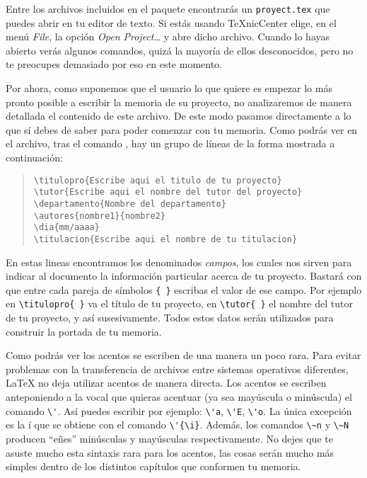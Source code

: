 Entre los archivos incluidos en el paquete encontrar\'as un \texttt{proyect.tex} que puedes abrir en tu editor de texto. 
Si est\'as usando \TeX{}nicCenter elige, en el men\'u \emph{File}, la opci\'on \emph{Open Project\dots}
y abre dicho archivo. Cuando lo hayas abierto ver\'as algunos comandos, quiz\'a la mayor\'ia de ellos desconocidos, 
pero no te preocupes demasiado por eso en este momento.

Por ahora, como suponemos que el usuario lo que quiere es empezar lo m\'as pronto posible a escribir la memoria de su 
proyecto, no analizaremos de manera detallada el contenido de este archivo. De este modo pasamos directamente a lo que 
s\'i debes de saber para poder comenzar con tu memoria. Como podr\'as ver en el archivo, tras el comando 
\verb++, hay un grupo de l\'ineas de la forma mostrada a continuaci\'on:

\begin{quote}
\begin{verbatim}
\titulopro{Escribe aqui el titulo de tu proyecto}
\tutor{Escribe aqui el nombre del tutor del proyecto}
\departamento{Nombre del departamento}
\autores{nombre1}{nombre2}
\dia{mm/aaaa}
\titulacion{Escribe aqui el nombre de tu titulacion}
\end{verbatim}
\end{quote}

En estas lineas encontramos los denominados \emph{campos}, los cuales nos sirven para indicar al documento
la informaci\'on particular acerca de tu proyecto. Bastar\'a con que entre cada pareja de s\'imbolos 
\verb|{ }| escribas el valor de ese campo. Por ejemplo en \verb|\titulopro{ }| va el t\'itulo de tu proyecto, 
en \verb|\tutor{ }| el nombre del tutor de tu proyecto, y as\'i susesivamente. Todos estos datos ser\'an utilizados
para construir la portada de tu memoria.

Como podr\'as ver los acentos se escriben de una manera un poco rara. Para evitar problemas
con la transferencia de archivos entre sistemas operativos diferentes, \LaTeX{} no
deja utilizar acentos de manera directa. Los acentos se escriben anteponiendo
a la vocal que quieras acentuar (ya sea may\'uscula o min\'uscula) el comando \verb|\'|.
As\'i puedes escribir por ejemplo: \verb|\'a|, \verb|\'E|, \verb|\'o|. La \'unica
excepci\'on es la \'i que se obtiene con el comando \verb|\'{\i}|. Adem\'as, los
comandos \verb|\~n| y \verb|\~N| producen ``e\~nes'' min\'usculas y may\'usculas
respectivamente. No dejes que te asuste mucho esta sintaxis rara para los acentos,
las cosas ser\'an mucho m\'as simples dentro de los distintos cap\'itulos que conformen tu memoria.

